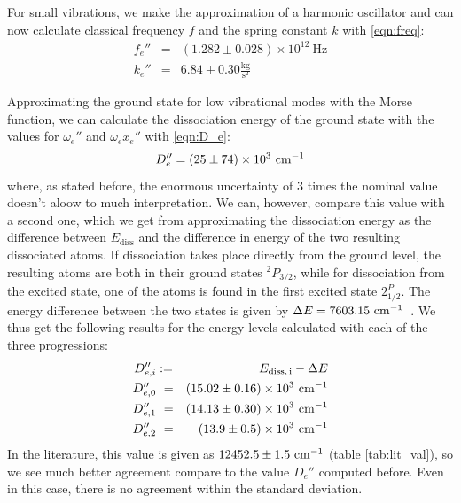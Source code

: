 For small vibrations, we make the approximation of a harmonic oscillator and 
can now calculate classical frequency $f$ and the spring constant $k$ with 
\eqref{eqn:freq}:
\begin{eqnarray}
    f_e'' &=& \left(1.282 \pm 0.028\right) \times 10^{12}\ \mathrm{Hz} \\
    k_e'' &=& 6.84 \pm 0.30 \mathrm{\frac{kg}{s^2}}
\end{eqnarray}

Approximating the ground state for low vibrational modes with the Morse function, 
we can calculate the dissociation energy of the ground state with the values for 
$\omega_e''$ and $\omega_e x_e''$ with \eqref{eqn:D_e}:
\begin{equation}
    D_e'' =\left(25 \pm 74\right) \times 10^{3} \ \mathrm{cm^{-1}}
\end{equation}
where, as stated before, the enormous uncertainty of $3$ times the nominal value 
doesn't aloow to much interpretation. We can, however, compare this value with a 
second one, which we get from approximating the 
dissociation energy as the difference between $E_\mathrm{diss}$ and the difference in 
energy of the two resulting dissociated atoms. If dissociation takes place directly 
from the ground level, the resulting atoms are both in their ground states $^2 P_{3/2}$, 
while for dissociation from the excited state, one of the atoms is found in the first 
excited state $2^ P_{1/2}$. The energy difference between the two states is given by 
$\Delta E = 7603.15 \ \mathrm{cm^{-1}}$~\cite{nist}. We thus get the following results for the energy 
levels calculated with each of the three progressions:
\begin{eqnarray}
    D_{e, i}'' &:=& E_\mathrm{diss,\, i} - \Delta E\\
    D_{e, 0}'' &\ =&\left(15.02 \pm 0.16\right) \times 10^{3} \ \mathrm{cm^{-1}} \\
    D_{e, 1}'' &\ =&\left(14.13 \pm 0.30\right) \times 10^{3} \ \mathrm{cm^{-1}} \\
    D_{e, 2}'' &\ =&\left(13.9 \pm 0.5\right) \times 10^{3} \ \mathrm{cm^{-1}}
\end{eqnarray}
In the literature, this value is given as $12452.5 \pm 1.5 \ \mathrm{cm^{-1}}$ (table \ref{tab:lit_val}), 
so we see much better agreement compare to the value $D_e''$ computed before. Even in this 
case, there is no agreement within the standard deviation. 

